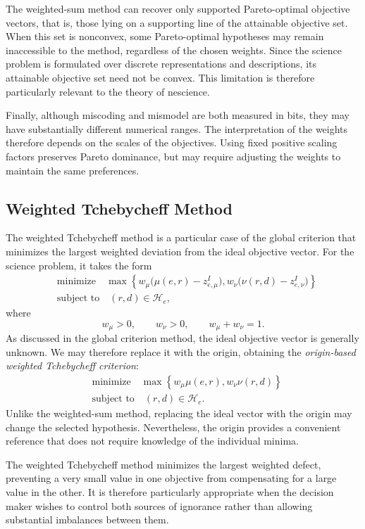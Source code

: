 The weighted-sum method can recover only supported Pareto-optimal objective vectors, that is, those lying on a supporting line of the attainable objective set. When this set is nonconvex, some Pareto-optimal hypotheses may remain inaccessible to the method, regardless of the chosen weights. Since the science problem is formulated over discrete representations and descriptions, its attainable objective set need not be convex. This limitation is therefore particularly relevant to the theory of nescience.

Finally, although miscoding and mismodel are both measured in bits, they may have substantially different numerical ranges. The interpretation of the weights therefore depends on the scales of the objectives. Using fixed positive scaling factors preserves Pareto dominance, but may require adjusting the weights to maintain the same preferences.


\subsection*{Weighted Tchebycheff Method}

The weighted Tchebycheff method is a particular case of the global criterion that minimizes the largest weighted deviation from the ideal objective vector. For the science problem, it takes the form
\begin{align*}
& \text{minimize} \quad \max\left\{w_\mu\bigl(\mu(e,r)-z_{e,\mu}^I\bigr),
w_\nu\bigl(\nu(r,d)-z_{e,\nu}^I\bigr) \right\} \\
& \text{subject to} \quad (r,d)\in\mathcal H_e,
\end{align*}
where
\[
w_\mu>0,\qquad w_\nu>0,\qquad w_\mu+w_\nu=1.
\]
As discussed in the global criterion method, the ideal objective vector is generally unknown. We may therefore replace it with the origin, obtaining the
\emph{origin-based weighted Tchebycheff criterion}:
\begin{align*}
& \text{minimize} \quad \max\left\{w_\mu\mu(e,r),w_\nu\nu(r,d) \right\} \\
& \text{subject to} \quad (r,d)\in\mathcal H_e.
\end{align*}
Unlike the weighted-sum method, replacing the ideal vector with the origin may change the selected hypothesis. Nevertheless, the origin provides a convenient reference that does not require knowledge of the individual minima.

The weighted Tchebycheff method minimizes the largest weighted defect, preventing a very small value in one objective from compensating for a large value in the other. It is therefore particularly appropriate when the decision maker wishes to control both sources of ignorance rather than allowing substantial imbalances between them.


